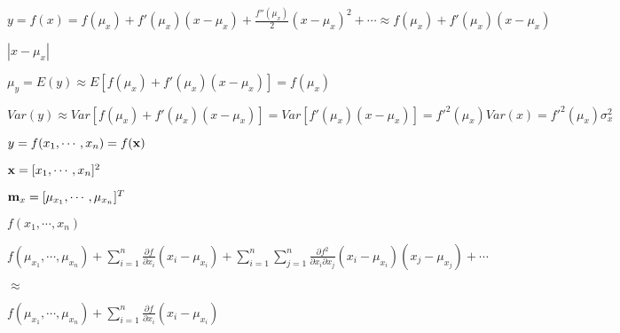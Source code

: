 \documentclass{article}
\def\lthtmlcheckvsize{\ifdim\ht\sizebox<\vsize 
  \ifdim\wd\sizebox<\hsize\expandafter\hfill\fi \expandafter\vfill
  \else\expandafter\vss\fi}%
\begin{document}
{\newpage\clearpage
{}%
$\displaystyle y=f(x)=f(\mu_x)+f'(\mu_x)(x-\mu_x)+\frac{f''(\mu_x)}{2}(x-\mu_x)^2+\cdots
\approx f(\mu_x)+f'(\mu_x)(x-\mu_x)$%
\lthtmlindisplaymathZ
\lthtmlcheckvsize\clearpage}

{\newpage\clearpage
{}%
$ |x-\mu_x|$%
\lthtmlindisplaymathZ
\lthtmlcheckvsize\clearpage}

{\newpage\clearpage
{}%
$\displaystyle \mu_y=E(y)\approx E[ f(\mu_x)+f'(\mu_x)(x-\mu_x)]=f(\mu_x)$%
\lthtmlindisplaymathZ
\lthtmlcheckvsize\clearpage}

{\newpage\clearpage
{}%
$\displaystyle Var(y)\approx Var[ f(\mu_x)+f'(\mu_x)(x-\mu_x) ]=Var[f'(\mu_x)(x-\mu_x)]
=f'^2(\mu_x) Var(x)=f'^2(\mu_x) \sigma^2_x$%
\lthtmlindisplaymathZ
\lthtmlcheckvsize\clearpage}

{\newpage\clearpage
{}%
$ y=f(x_1,\cdots,x_n)=f({\bf x})$%
\lthtmlindisplaymathZ
\lthtmlcheckvsize\clearpage}

{\newpage\clearpage
{}%
$ {\bf x}=[x_1,\cdots,x_n]^2$%
\lthtmlindisplaymathZ
\lthtmlcheckvsize\clearpage}

{\newpage\clearpage
{}%
$ {\bf m}_x=[\mu_{x_1},\cdots,\mu_{x_n}]^T$%
\lthtmlindisplaymathZ
\lthtmlcheckvsize\clearpage}

{\newpage\clearpage
{}%
$\displaystyle f(x_1,\cdots,x_n)$%
\lthtmlindisplaymathZ
\lthtmlcheckvsize\clearpage}

{\newpage\clearpage
{}%
$\displaystyle f(\mu_{x_1},\cdots,\mu_{x_n})+\sum_{i=1}^n \frac{\partial f}{\partial x_i} (x_i-\mu_{x_i})
+\sum_{i=1}^n\sum_{j=1}^n \frac{\partial f^2}{\partial x_i \partial x_j}
(x_i-\mu_{x_i})(x_j-\mu_{x_j})+\cdots$%
\lthtmlindisplaymathZ
\lthtmlcheckvsize\clearpage}

{\newpage\clearpage
{}%
$\displaystyle \approx$%
\lthtmlindisplaymathZ
\lthtmlcheckvsize\clearpage}

{\newpage\clearpage
{}%
$\displaystyle f(\mu_{x_1},\cdots,\mu_{x_n})
+\sum_{i=1}^n \frac{\partial f}{\partial x_i} (x_i-\mu_{x_i})$%
\lthtmlindisplaymathZ
\lthtmlcheckvsize\clearpage}
\end{document}
